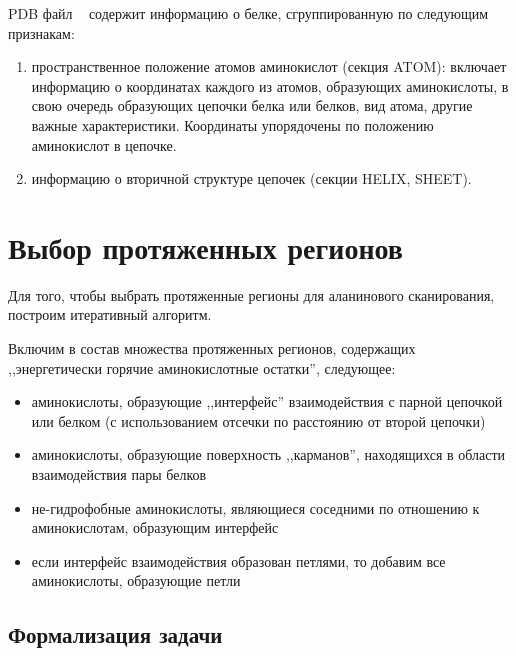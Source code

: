 PDB файл ~\cite{pdb} содержит информацию о белке, сгруппированную по следующим признакам: 
\begin{enumerate}
\item пространственное положение атомов аминокислот (секция ATOM):
включает информацию о координатах каждого из атомов, образующих аминокислоты, в свою очередь образующих цепочки белка или белков, вид атома, другие важные характеристики. Координаты упорядочены по положению аминокислот в цепочке.

\item информацию о вторичной структуре цепочек (секции HELIX, SHEET).
\end{enumerate}


\section{Выбор протяженных регионов}
Для того, чтобы выбрать протяженные регионы для аланинового сканирования, построим итеративный алгоритм.

Включим в состав множества протяженных регионов, содержащих ,,энергетически горячие аминокислотные остатки'', следующее:
\begin{itemize}
\item аминокислоты, образующие ,,интерфейс'' взаимодействия с парной цепочкой или белком (с использованием отсечки по расстоянию от второй цепочки)
\item аминокислоты, образующие поверхность ,,карманов'', находящихся в области взаимодействия пары белков
\item не-гидрофобные аминокислоты, являющиеся соседними по отношению к аминокислотам, образующим интерфейс
\item если интерфейс взаимодействия образован петлями, то добавим все аминокислоты, образующие петли 
\end{itemize}


\subsection{Формализация задачи}

